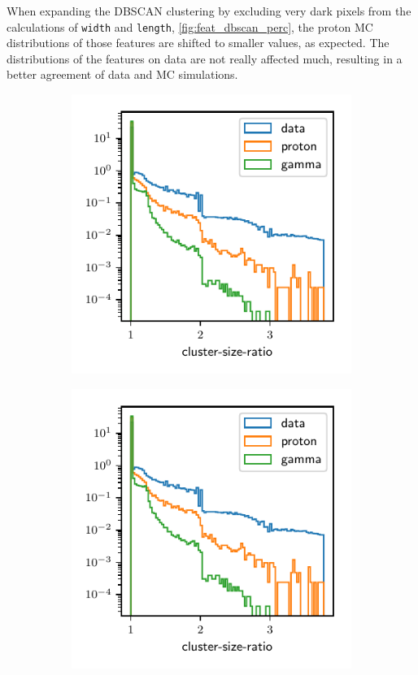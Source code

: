 When expanding the DBSCAN clustering by excluding very dark pixels from the
calculations of \texttt{width} and \texttt{length},
\autoref{fig:feat_dbscan_perc}, the proton MC distributions of those features
are shifted to smaller values, as expected. The distributions of the features
on data are not really affected much, resulting in a better agreement of data
and MC simulations.
%
\begin{figure}
  \begin{subfigure}{0.5\textwidth}
    \centering
    \includegraphics[width=\textwidth, page=23]{Plots/data_mc/features_DBSCAN.pdf}
  \end{subfigure}
  \begin{subfigure}{0.5\textwidth}
    \centering
    \includegraphics[width=\textwidth, page=13]{Plots/data_mc/features_DBSCAN.pdf}

\end{subfigure}
\end{figure}
